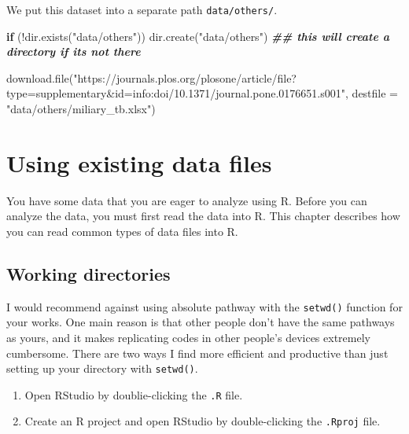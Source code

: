 \documentclass[
]{book}
\newenvironment{Shaded}{\begin{snugshade}}{\end{snugshade}}
\newcommand{\AttributeTok}[1]{\textcolor[rgb]{0.77,0.63,0.00}{#1}}
\newcommand{\ControlFlowTok}[1]{\textcolor[rgb]{0.13,0.29,0.53}{\textbf{#1}}}
\newcommand{\DocumentationTok}[1]{\textcolor[rgb]{0.56,0.35,0.01}{\textbf{\textit{#1}}}}
\newcommand{\FunctionTok}[1]{\textcolor[rgb]{0.00,0.00,0.00}{#1}}
\newcommand{\NormalTok}[1]{#1}
\newcommand{\SpecialCharTok}[1]{\textcolor[rgb]{0.00,0.00,0.00}{#1}}
\newcommand{\StringTok}[1]{\textcolor[rgb]{0.31,0.60,0.02}{#1}}
\providecommand{\tightlist}{%
  \setlength{\itemsep}{0pt}\setlength{\parskip}{0pt}}
\begin{document}
We put this dataset into a separate path \texttt{data/others/}.

\begin{Shaded}
\begin{Highlighting}[]
\ControlFlowTok{if}\NormalTok{ (}\SpecialCharTok{!}\FunctionTok{dir.exists}\NormalTok{(}\StringTok{"data/others"}\NormalTok{)) }
    \FunctionTok{dir.create}\NormalTok{(}\StringTok{"data/others"}\NormalTok{) }\DocumentationTok{\#\# this will create a directory if it\textquotesingle{}s not there}

\FunctionTok{download.file}\NormalTok{(}\StringTok{"https://journals.plos.org/plosone/article/file?type=supplementary\&id=info:doi/10.1371/journal.pone.0176651.s001"}\NormalTok{, }
              \AttributeTok{destfile =} \StringTok{"data/others/miliary\_tb.xlsx"}\NormalTok{)}
\end{Highlighting}
\end{Shaded}

\hypertarget{using-existing-data-files}{%
\chapter{Using existing data files}\label{using-existing-data-files}}

You have some data that you are eager to analyze using R. Before you can analyze the data, you must first read the data into R. This chapter describes how you can read common types of data files into R.

\hypertarget{working-directories}{%
\section{Working directories}\label{working-directories}}

I would recommend against using absolute pathway with the \texttt{setwd()} function for your works. One main reason is that other people don't have the same pathways as yours, and it makes replicating codes in other people's devices extremely cumbersome. There are two ways I find more efficient and productive than just setting up your directory with \texttt{setwd()}.

\begin{enumerate}
\def\labelenumi{\arabic{enumi}.}
\tightlist
\item
  Open RStudio by doublie-clicking the \texttt{.R} file.
\item
  Create an R project and open RStudio by double-clicking the \texttt{.Rproj} file.
\end{enumerate}
\end{document}
